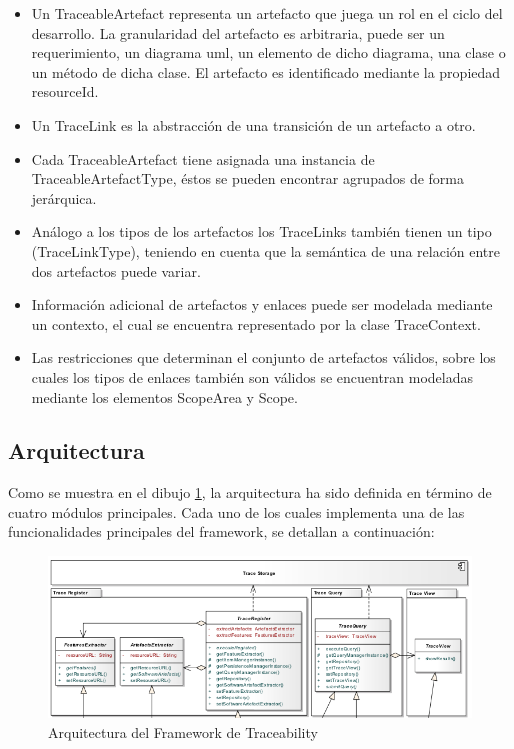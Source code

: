 \documentclass[a4paper,12pt,oneside,spanish]{book}
\begin{document}
\begin{itemize}
\item Un TraceableArtefact representa un artefacto que juega un rol en el ciclo del desarrollo. La granularidad del artefacto es arbitraria, puede ser un requerimiento, un diagrama \gls{uml}, un elemento de dicho diagrama, una clase o un método de dicha clase. El artefacto es identificado mediante la propiedad resourceId.
\item Un TraceLink es la abstracción de una transición de un artefacto a otro.
\item Cada TraceableArtefact tiene asignada una instancia de TraceableArtefactType, éstos se pueden encontrar agrupados de forma jerárquica.
 \item Análogo a los tipos de los artefactos los TraceLinks también tienen un tipo (TraceLinkType), teniendo en cuenta que la semántica de una relación entre dos artefactos puede variar.
\item Información adicional de artefactos y enlaces puede ser modelada mediante un contexto, el cual se encuentra representado por la clase TraceContext.
\item Las restricciones que determinan el conjunto de artefactos válidos, sobre los cuales los tipos de enlaces también son válidos se encuentran modeladas mediante los elementos ScopeArea y Scope.
\end{itemize}

\subsection{Arquitectura}

Como se muestra en el dibujo \ref{fig:SPLArquitectura}, la arquitectura ha sido definida en término de cuatro módulos principales. Cada uno de los cuales implementa una de las funcionalidades principales del framework, se detallan a continuación:

\begin{figure}[hbtp]
\centering
\includegraphics[scale=.55]{./img/ArquitecturaTraceabilityFramework}
\caption{Arquitectura del Framework de Traceability}
\label{fig:SPLArquitectura}
\end{figure}
\end{document}
